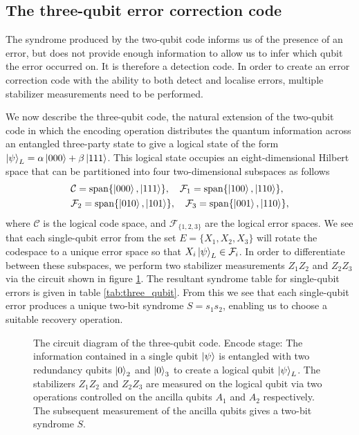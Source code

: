 \documentclass[]{arxiv}
\theoremstyle{plain}%
\theoremstyle{definition}
\theoremstyle{remark}
\begin{document}
\subsection{The three-qubit error correction code} \label{sec:three_qubit}

The syndrome produced by the two-qubit code informs us of the presence of an error, but does not provide enough information to allow us to infer which qubit the error occurred on. It is therefore a detection code. In order to create an error correction code with the ability to both detect and localise errors, multiple stabilizer measurements need to be performed.

We now describe the three-qubit code, the natural extension of the two-qubit code in which the encoding operation distributes the quantum information across an entangled three-party state to give a logical state of the form $\ket{\psi}_L=\alpha\ket{000}+\beta\ket{111}$. This logical state occupies an eight-dimensional Hilbert space that can be partitioned into four two-dimensional subspaces as follows
%
\begin{equation}\begin{split}
&\mathcal{C}={\rm span}\{\ket{000},\ket{111}\}, \quad \mathcal{F}_1={\rm span}\{\ket{100},\ket{110}\}, \\ &\mathcal{F}_2={\rm span}\{\ket{010},\ket{101}\}, \quad \mathcal{F}_3 ={\rm span}\{\ket{001},\ket{110}\}\rm,
\end{split}
\end{equation}
%
where $\mathcal{C}$ is the logical code space, and $\mathcal{F}_{\{1,2,3\}}$ are the logical error spaces. We see that each single-qubit error from the set $E=\{X_1,X_2,X_3\}$ will rotate the codespace to a unique error space so that $X_i \ket{\psi}_L \in \mathcal{F}_i$. In order to differentiate between these subspaces, we perform two stabilizer measurements $Z_1Z_2$ and $Z_2Z_3$ via the circuit shown in figure \ref{fig:three_qubit_code}. The resultant syndrome table for single-qubit errors is given in table \ref{tab:three_qubit}. From this we see that each single-qubit error produces a unique two-bit syndrome $S=s_1s_2$, enabling us to choose a suitable recovery operation.

\begin{figure}
	\centering
	
	\caption{The circuit diagram of the three-qubit code. Encode stage: The information contained in a single qubit $\ket{\psi}$ is entangled with two redundancy qubits $\ket{0}_2$ and $\ket{0}_3$ to create a logical qubit $\ket{\psi}_L$. The stabilizers $Z_1Z_2$ and $Z_2Z_3$ are measured on the logical qubit via two operations controlled on the ancilla qubits $A_1$ and $A_2$ respectively. The subsequent measurement of the ancilla qubits gives a two-bit syndrome $S$.}
	\label{fig:three_qubit_code}
\end{figure}
 
\end{document}
